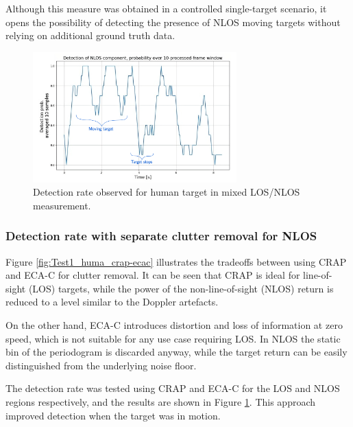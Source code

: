 Although this measure was obtained in a controlled single-target scenario, it opens the possibility of detecting the presence of NLOS moving targets without relying on additional ground truth data.


\begin{figure}[H]
	\centering
	\includegraphics[width=0.7\textwidth]{Images/Test1/moving_avg-transformed_wtext}
	\caption{Detection rate observed for human target in mixed LOS/NLOS measurement.}
	\label{fig:Test1_moving_avg}
\end{figure}


\subsubsection{Detection rate with separate clutter removal for NLOS}

Figure \ref{fig:Test1_huma_crap-ecac} illustrates the tradeoffs between using CRAP and ECA-C for clutter removal. It can be seen that CRAP is ideal for line-of-sight (LOS) targets, while the power of the non-line-of-sight (NLOS) return is reduced to a level similar to the Doppler artefacts.

On the other hand, ECA-C introduces distortion and loss of information at zero speed, which is not suitable for any use case requiring LOS. In NLOS the static bin of the periodogram is discarded anyway, while the target return can be easily distinguished from the underlying noise floor.

The detection rate was tested using CRAP and ECA-C for the LOS and NLOS regions respectively, and the results are shown in Figure \ref{fig:Test1_moving_avg}.
This approach improved detection when the target was in motion.

